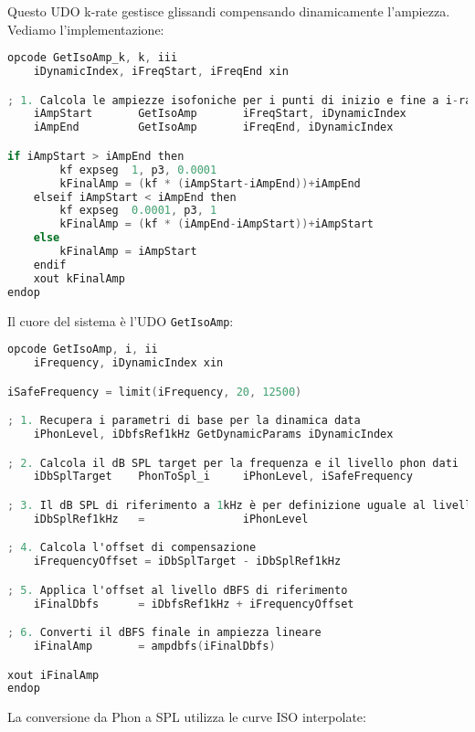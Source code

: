 Questo UDO k-rate gestisce glissandi compensando dinamicamente l'ampiezza. Vediamo l'implementazione:

\begin{lstlisting}[language=C]
opcode GetIsoAmp_k, k, iii
    iDynamicIndex, iFreqStart, iFreqEnd xin

; 1. Calcola le ampiezze isofoniche per i punti di inizio e fine a i-rate
    iAmpStart       GetIsoAmp       iFreqStart, iDynamicIndex
    iAmpEnd         GetIsoAmp       iFreqEnd, iDynamicIndex

if iAmpStart > iAmpEnd then
        kf expseg  1, p3, 0.0001
        kFinalAmp = (kf * (iAmpStart-iAmpEnd))+iAmpEnd
    elseif iAmpStart < iAmpEnd then
        kf expseg  0.0001, p3, 1
        kFinalAmp = (kf * (iAmpEnd-iAmpStart))+iAmpStart
    else
        kFinalAmp = iAmpStart
    endif
    xout kFinalAmp
endop
\end{lstlisting}

Il cuore del sistema è l'UDO \texttt{GetIsoAmp}:

\begin{lstlisting}[language=C]
opcode GetIsoAmp, i, ii
    iFrequency, iDynamicIndex xin

iSafeFrequency = limit(iFrequency, 20, 12500)

; 1. Recupera i parametri di base per la dinamica data
    iPhonLevel, iDbfsRef1kHz GetDynamicParams iDynamicIndex

; 2. Calcola il dB SPL target per la frequenza e il livello phon dati
    iDbSplTarget    PhonToSpl_i     iPhonLevel, iSafeFrequency

; 3. Il dB SPL di riferimento a 1kHz è per definizione uguale al livello Phon
    iDbSplRef1kHz   =               iPhonLevel

; 4. Calcola l'offset di compensazione
    iFrequencyOffset = iDbSplTarget - iDbSplRef1kHz

; 5. Applica l'offset al livello dBFS di riferimento
    iFinalDbfs      = iDbfsRef1kHz + iFrequencyOffset

; 6. Converti il dBFS finale in ampiezza lineare
    iFinalAmp       = ampdbfs(iFinalDbfs)

xout iFinalAmp
endop
\end{lstlisting}

La conversione da Phon a SPL utilizza le curve ISO interpolate:

